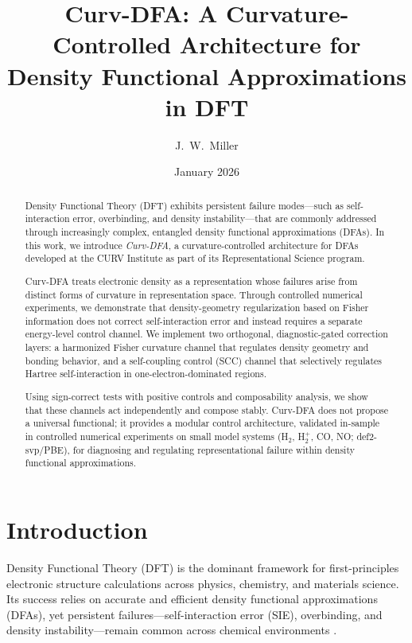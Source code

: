 \documentclass[11pt]{article}
\title{\textbf{Curv-DFA: A Curvature-Controlled Architecture for Density Functional Approximations in DFT}}
\author[1]{J.\ W.\ Miller}
\affil[1]{CURV Institute\\
(CURV Foundation for Representational Science, \textit{in formation})\\
Geneva, Switzerland}
\date{January 2026}
\begin{document}
\maketitle

\begin{abstract}
Density Functional Theory (DFT) exhibits persistent failure modes—such as self-interaction error, overbinding, and density instability—that are commonly addressed through increasingly complex, entangled density functional approximations (DFAs). In this work, we introduce \emph{Curv-DFA}, a curvature-controlled architecture for DFAs developed at the CURV Institute as part of its Representational Science program.

Curv-DFA treats electronic density as a representation whose failures arise from distinct forms of curvature in representation space. Through controlled numerical experiments, we demonstrate that density-geometry regularization based on Fisher information does not correct self-interaction error and instead requires a separate energy-level control channel. We implement two orthogonal, diagnostic-gated correction layers: a harmonized Fisher curvature channel that regulates density geometry and bonding behavior, and a self-coupling control (SCC) channel that selectively regulates Hartree self-interaction in one-electron-dominated regions.

Using sign-correct tests with positive controls and composability analysis, we show that these channels act independently and compose stably. Curv-DFA does not propose a universal functional; it provides a modular control architecture, validated in-sample in controlled numerical experiments on small model systems (H$_2$, H$_2^+$, CO, NO; def2-svp/PBE), for diagnosing and regulating representational failure within density functional approximations.
\end{abstract}

\section{Introduction}

Density Functional Theory (DFT) \cite{HohenbergKohn,KohnSham} is the dominant framework for first-principles electronic structure calculations across physics, chemistry, and materials science. Its success relies on accurate and efficient density functional approximations (DFAs), yet persistent failures—self-interaction error (SIE), overbinding, and density instability—remain common across chemical environments \cite{PerdewZungerSIC}.
\end{document}
